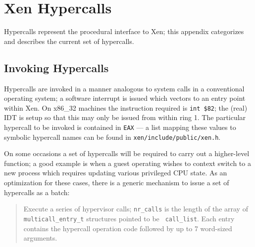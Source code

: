 \documentclass[11pt,twoside,final,openright]{xenstyle}
\begin{document}
\appendix






\newcommand{\hypercall}[1]{\vspace{2mm}{\sf #1}}



\hypercall{physdev\_op(void *physdev\_op)}


\hypercall{vm\_assist(unsigned int cmd, unsigned int type)}




\chapter{Xen Hypercalls}
\label{a:hypercalls}

Hypercalls represent the procedural interface to Xen; this appendix 
categorizes and describes the current set of hypercalls. 

\section{Invoking Hypercalls} 

Hypercalls are invoked in a manner analogous to system calls in a
conventional operating system; a software interrupt is issued which
vectors to an entry point within Xen. On x86\_32 machines the
instruction required is {\tt int \$82}; the (real) IDT is setup so
that this may only be issued from within ring 1. The particular 
hypercall to be invoked is contained in {\tt EAX} --- a list 
mapping these values to symbolic hypercall names can be found 
in {\tt xen/include/public/xen.h}. 


On some occasions a set of hypercalls will be required to carry
out a higher-level function; a good example is when a guest 
operating wishes to context switch to a new process which 
requires updating various privileged CPU state. As an optimization
for these cases, there is a generic mechanism to issue a set of 
hypercalls as a batch: 

\begin{quote}
\hypercall{multicall(void *call\_list, int nr\_calls)}

Execute a series of hypervisor calls; {\tt nr\_calls} is the length of
the array of {\tt multicall\_entry\_t} structures pointed to be {\tt
call\_list}. Each entry contains the hypercall operation code followed
by up to 7 word-sized arguments.
\end{quote}
\end{document}
